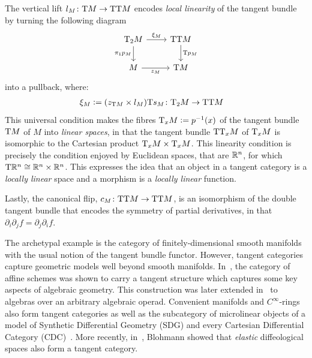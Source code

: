 \begin{content}
The vertical lift $l_M\colon\mathrm{T} M\to\mathrm{T}\mathrm{T} M$ encodes \emph{local linearity} of the tangent bundle by turning the following diagram
\begin{equation*}
\begin{tikzcd}
{\T_2M} & {\T\T M} \\
M & {\T M}
\arrow["{\xi_M}", from=1-1, to=1-2]
\arrow["{\pi_1p_M}"', from=1-1, to=2-1]
\arrow["{\T p_M}", from=1-2, to=2-2]
\arrow["{z_M}"', from=2-1, to=2-2]
\end{tikzcd}
\end{equation*}
into a pullback, where:
\begin{align*}
&\xi_M\mathrel{\mathop:}=(z_{\mathrm{T} M}\times l_M)\mathrm{T} s_M\colon\mathrm{T}_2M\to\mathrm{T}\mathrm{T} M
\end{align*}
This universal condition makes the fibres $\mathrm{T}_xM\mathrel{\mathop:}=p^{-1}(x)$ of the tangent bundle $\mathrm{T} M$ of $M$ into \textit{linear spaces}, in that the tangent bundle $\mathrm{T}\mathrm{T}_xM$ of $\mathrm{T}_xM$ is isomorphic to the Cartesian product $\mathrm{T}_xM\times\mathrm{T}_xM$. This linearity condition is precisely the condition enjoyed by Euclidean spaces, that are $\mathbb{\bm{R}}^n$, for which $\mathrm{T}\mathbb{\bm{R}}^n\cong\mathbb{\bm{R}}^n\times\mathbb{\bm{R}}^n$. This expresses the idea that an object in a tangent category is a \emph{locally linear} space and a morphism is a \emph{locally linear} function.

Lastly, the canonical flip, $c_M\colon\mathrm{T}\mathrm{T} M\to\mathrm{T}\mathrm{T} M$, is an isomorphism of the double tangent bundle that encodes the symmetry of partial derivatives, in that $\partial_i\partial_jf=\partial_j\partial_if$.

The archetypal example is the category of finitely-dimensional smooth manifolds with the usual notion of the tangent bundle functor. However, tangent categories capture geometric models well beyond smooth manifolds. In~\cite{cruttwell:algebraic-geometry}, the category of affine schemes was shown to carry a tangent structure which captures some key aspects of algebraic geometry. This construction was later extended in~\cite{ikonicoff:operadic-algebras-tangent-cats} to algebras over an arbitrary algebraic operad. Convenient manifolds and $C^\infty$-rings also form tangent categories as well as the subcategory of microlinear objects of a model of Synthetic Differential Geometry (SDG) and every Cartesian Differential Category (CDC)~\cite{cockett:tangent-cats}. More recently, in~\cite{blohmann:elastic-diffeological-spaces}, Blohmann showed that \emph{elastic} diffeological spaces also form a tangent category.
\end{content}

